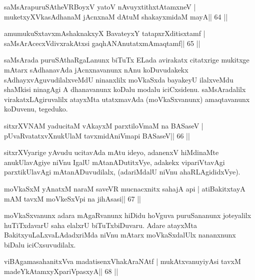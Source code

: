 
\begin{shl}
saMsArapuruSAtheVRBoyxV yatoV nAvuyxtithxtAtamxneV |
muketxyXVkasAdhanaM jAcnxnaM dAtuM shakayxmidaM mayA\hfill || 64 ||
\end{shl}

\begin{shl}
amumukuSxtavxmAshaknakxyX BavateyxY tatapxrXditisxtamf |
saMsArAcecxVdivxrakAtx\s si gaqhANAnutatxmAmaqtamf\hfill || 65 ||
\end{shl}

\begin{artha}
saMsArada puruSAthaRgaLanunx biTuTx ELada avirakatx citatxrige
mukitxge mAtarx sAdhanavAda jAcnxnavanunx nAnu koDuvudakekx
sAdhayxvAguvudilalxveMdU ninanxlilx moVkaSxda bayakeyU ilalxveMdu
shaMkisi ninagAgi A dhanavanunx koDalu modalu
iciCxsidenu. saMsAradalilx virakatxLAgiruvalilx atayxMta utatxmavAda
(moVkaSxvanunx) amaqtavanunx koDuvenu, tegeduko.
\end{artha}

\begin{shl}
sitxrXVNAM yaducitaM vAkayxM parxtiloVmaM na BASaseV |
pUvaRvatatxvXnukUlaM tavxmidAniVmapi BASaseV\hfill || 66 ||
\end{shl}

\begin{artha}
sitxrXVyarige yAvudu ucitavAda mAtu ideyo, adanenxV hiMdinaMte anukUlavAgiye niVnu IgalU mAtanADutitxVye, adakekx vipariVtavAgi parxtikUlavAgi mAtanADuvudilalx, (adariMdalU niVnu ahaRLAgididxVye).
\end{artha}

\begin{shl}
moVkaSxM yAnatxM naraM saveVR mucnacxnitx sahajA api |
atiBakitxtayA mAM tavxM moVkeSxV\s pi na jihAsasi\hfill || 67 ||
\end{shl}

\begin{artha}
moVkaSxvanunx adara mAgaRvanunx hiDidu hoVguva puruSananunx joteyalilx huTiTxdavarU saha elalxrU biTuTxbiDuvaru. Adare atayxMta BakitxyuLaLxvaLAdadxriMda niVnu mAtarx moVkaSxdalUlx nananxnunx biDalu iciCxsuvudilalx.
\end{artha}

\begin{shl}
viBAgamasahanitxVva madatisenxVhakAraNAtf |
mukAtxvanuyiyAsi tavxM madeYkAtamxyXpariVpasxyA\hfill || 68 ||
\end{shl}


